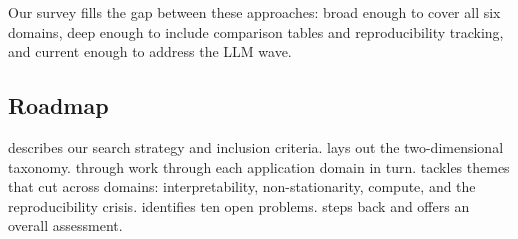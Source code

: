 Our survey fills the gap between these approaches: broad enough to cover all six domains, deep enough to include comparison tables and reproducibility tracking, and current enough to address the LLM wave.

\subsection{Roadmap}

 describes our search strategy and inclusion criteria.  lays out the two-dimensional taxonomy.  through  work through each application domain in turn.  tackles themes that cut across domains: interpretability, non-stationarity, compute, and the reproducibility crisis.  identifies ten open problems.  steps back and offers an overall assessment.
